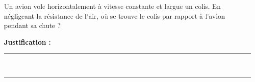 Un avion vole horizontalement à vitesse constante et largue un colis. En négligeant la résistance de l'air, où se trouve le colis par rapport à l'avion pendant sa chute ?

\choices

\noindent\textbf{Justification :} \hrulefill \\[2.5ex]
\rule{\linewidth}{0.4pt} \\[2.5ex]
\rule{\linewidth}{0.4pt}
\vfill
